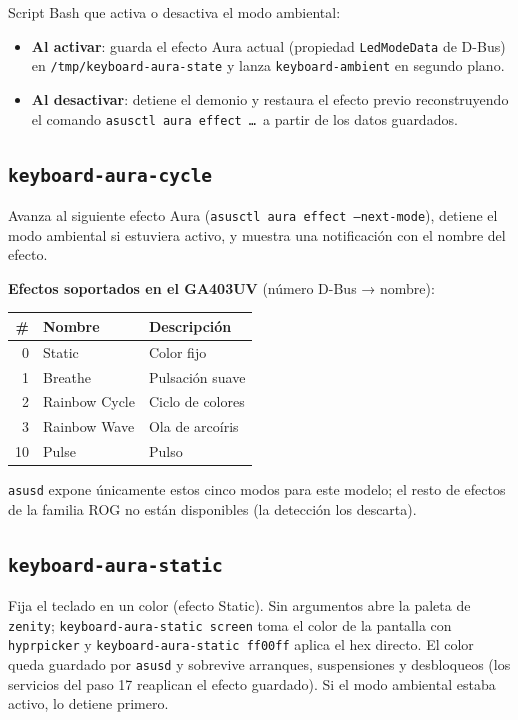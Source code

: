 \documentclass[12pt,a4paper]{article}
\begin{document}
Script Bash que activa o desactiva el modo ambiental:

\begin{itemize}[nosep]
  \item \textbf{Al activar}: guarda el efecto Aura actual (propiedad
        \texttt{LedModeData} de D-Bus) en \texttt{/tmp/keyboard-aura-state} y
        lanza \texttt{keyboard-ambient} en segundo plano.
  \item \textbf{Al desactivar}: detiene el demonio y restaura el efecto previo
        reconstruyendo el comando \texttt{asusctl aura effect \ldots}\ a partir
        de los datos guardados.
\end{itemize}

\subsection{\texttt{keyboard-aura-cycle}}

Avanza al siguiente efecto Aura (\texttt{asusctl aura effect --next-mode}),
detiene el modo ambiental si estuviera activo, y muestra una notificación con
el nombre del efecto.

\textbf{Efectos soportados en el GA403UV} (número D-Bus → nombre):

\begin{center}
\begin{tabular}{rll}
  \toprule
  \# & Nombre & Descripción \\
  \midrule
  0  & Static           & Color fijo \\
  1  & Breathe          & Pulsación suave \\
  2  & Rainbow Cycle    & Ciclo de colores \\
  3  & Rainbow Wave     & Ola de arcoíris \\
  10 & Pulse            & Pulso \\
  \bottomrule
\end{tabular}
\end{center}

\texttt{asusd} expone únicamente estos cinco modos para este modelo; el resto de
efectos de la familia ROG no están disponibles (la detección los descarta).

\subsection{\texttt{keyboard-aura-static}}

Fija el teclado en un color (efecto Static). Sin argumentos abre la paleta de
\texttt{zenity}; \texttt{keyboard-aura-static screen} toma el color de la
pantalla con \texttt{hyprpicker} y \texttt{keyboard-aura-static ff00ff} aplica
el hex directo. El color queda guardado por \texttt{asusd} y sobrevive
arranques, suspensiones y desbloqueos (los servicios del paso 17 reaplican el
efecto guardado). Si el modo ambiental estaba activo, lo detiene primero.
\end{document}
